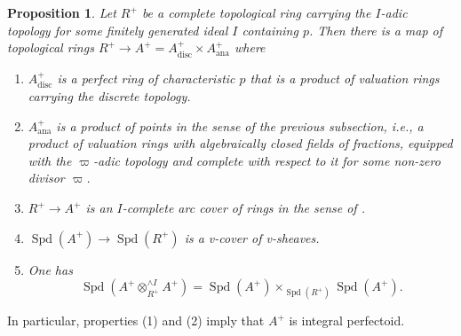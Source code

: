 \documentclass[10pt,twoside]{article}
\numberwithin{equation}{section}
\theoremstyle{plain}
\newtheorem{myprop}[mythm]{Proposition}
\theoremstyle{definition}
\DeclareMathOperator{\Spd}{Spd}
\DeclareMathOperator{\ana}{ana}
\DeclareMathOperator{\disc}{disc}
\begin{document}
\begin{myprop}\label{lemmaCoveringg}
    Let \(R^+\) be a complete topological ring carrying the \(I\)-adic topology for some finitely generated ideal \(I\) containing \(p\). Then there is a map of topological rings \(R^+\to A^+=A_{\disc}^+\times A_{\ana}^+\) where
\begin{enumerate}
\item \(A_{\disc}^+\) is a perfect ring of characteristic \(p\) that is a product of valuation rings carrying the discrete topology.
\item \(A_{\ana}^+\) is a product of points in the sense of the previous subsection, i.e., a product of valuation rings with algebraically closed fields of fractions, equipped with the \(\varpi\)-adic topology and complete with respect to it for some non-zero divisor \(\varpi\).
\item \(R^+\to A^+\) is an \(I\)-complete arc cover of rings in the sense of .
\item \(\Spd(A^+)\to \Spd(R^+)\) is a v-cover of v-sheaves.
\item One has \[\Spd(A^+\otimes^{\wedge I}_{R^+} A^+)=\Spd(A^+)\times_{\Spd(R^+)} \Spd(A^+).\]
\end{enumerate} 
\end{myprop}

In particular, properties (1) and (2) imply that \(A^+\) is integral perfectoid.
\end{document}
